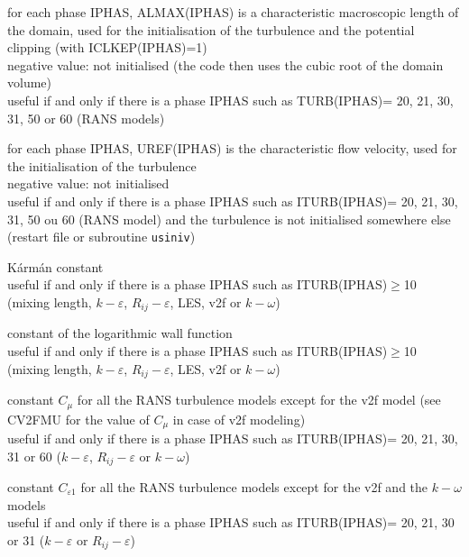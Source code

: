 {for each phase IPHAS, ALMAX(IPHAS) is a characteristic macroscopic
length of the domain, used for the initialisation of the turbulence and
the potential clipping (with ICLKEP(IPHAS)=1)\\
negative value: not initialised (the code then uses the cubic root of
the domain volume)\\
useful if and only if there is a phase IPHAS such as
TURB(IPHAS)= 20, 21, 30, 31, 50 or 60 (RANS models)}

{for each phase IPHAS, UREF(IPHAS) is the characteristic flow velocity,
used for the initialisation of the turbulence\\
negative value: not initialised\\
useful if and only if there is a phase IPHAS such as
ITURB(IPHAS)= 20, 21, 30, 31, 50 ou 60 (RANS model)
and the turbulence is not initialised somewhere
else (restart file or subroutine \texttt{usiniv})}



{K\'arm\'an constant\\
useful if and only if there is a phase IPHAS such as ITURB(IPHAS)$\geqslant$10
(mixing length, $k-\varepsilon$, $R_{ij}-\varepsilon$, LES, v2f or $k-\omega$)}

{constant of the logarithmic wall function\\
useful if and only if there is a phase IPHAS such as ITURB(IPHAS)$\geqslant$10
(mixing length, $k-\varepsilon$, $R_{ij}-\varepsilon$, LES, v2f or $k-\omega$)}

{constant $C_\mu$ for all the RANS turbulence models except for the v2f model
(see CV2FMU for the value of $C_\mu$ in case of v2f modeling)\\
useful if and only if there is a phase IPHAS such as ITURB(IPHAS)= 20,
21, 30, 31 or 60 ($k-\varepsilon$, $R_{ij}-\varepsilon$ or $k-\omega$)}

{constant $C_{\varepsilon 1}$ for all the RANS turbulence models except
for the v2f and the $k-\omega$ models\\
useful if and only if there is a phase IPHAS such as ITURB(IPHAS)= 20,
21, 30 or 31 ($k-\varepsilon$ or $R_{ij}-\varepsilon$)}

